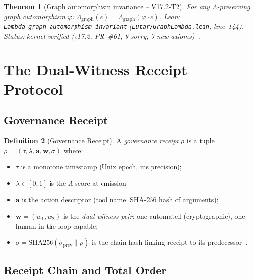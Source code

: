 \documentclass[11pt,letterpaper]{article}
\newtheorem{theorem}{Theorem}[section]
\theoremstyle{definition}
\newtheorem{definition}[theorem]{Definition}
\theoremstyle{remark}
\begin{document}
\begin{theorem}[Graph automorphism invariance -- V17.2-T2]
\label{thm:graph-auto}
For any \(\Lambda\)-preserving graph automorphism \(\varphi\):
\(
  \Lambda_{\mathrm{graph}}(e) = \Lambda_{\mathrm{graph}}(\varphi \cdot e).
\)
\textup{Lean:} \texttt{Lambda\_graph\_automorphism\_invariant}
(\texttt{Lutar/GraphLambda.lean}, line~144).
Status: kernel-verified (v17.2, PR~\#61, 0 sorry, 0 new
axioms)~\cite{LutarThesisV17}.
\end{theorem}

\section{The Dual-Witness Receipt Protocol}
\label{sec:receipts}

\subsection{Governance Receipt}

\begin{definition}[Governance Receipt]
\label{def:receipt}
A \emph{governance receipt} \(\rho\) is a tuple
\(\rho = (\tau, \lambda, \mathbf{a}, \mathbf{w}, \sigma)\) where:
\begin{itemize}\setlength{\itemsep}{0pt}
  \item \(\tau\) is a monotone timestamp (Unix epoch, ms precision);
  \item \(\lambda \in [0,1]\) is the \(\Lambda\)-score at emission;
  \item \(\mathbf{a}\) is the action descriptor (tool name,
    SHA-256 hash of arguments);
  \item \(\mathbf{w} = (w_1, w_2)\) is the \emph{dual-witness pair}:
    one automated (cryptographic), one human-in-the-loop capable;
  \item \(\sigma = \mathrm{SHA256}(\sigma_{\mathrm{prev}} \| \rho)\)
    is the chain hash linking receipt to its predecessor~\cite{NIST-FIPS-180-4}.
\end{itemize}
\end{definition}

\subsection{Receipt Chain and Total Order}
\label{subsec:receipt-chain}
\end{document}
